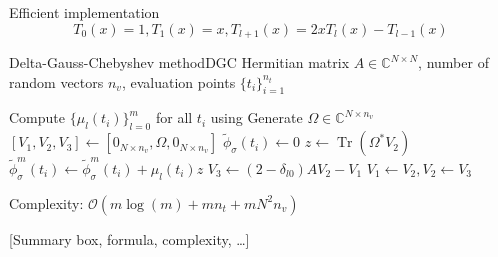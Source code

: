Efficient implementation \cite[Chapter~3]{trefethen2019chebyshev}
\begin{equation}
    T_0(x) = 1, T_1(x) = x, T_{l+1}(x) = 2x T_l(x) - T_{l-1}(x)
    \label{equ:2-chebyshev-DGC-chebyshev-recursion}
\end{equation}

\begin{algo}{Delta-Gauss-Chebyshev method}{DGC}
    Hermitian matrix $A \in \mathbb{C}^{N \times N}$, number of random vectors $n_v$,
    evaluation points $\{t_i\}_{i=1}^{n_t}$
    \begin{algorithmic}[1]
        \State Compute $\{\mu_l(t_i)\}_{l=0}^m$ for all $t_i$ using 
        \State Generate $\Omega \in \mathbb{C}^{N \times n_v}$
        \State $[V_1, V_2, V_3] \gets [0_{N \times n_v}, \Omega, 0_{N \times n_v}]$
        \State $\widetilde{\phi}_{\sigma}(t_i) \gets 0$
          \State $z \gets \operatorname{Tr}(\Omega^{\ast} V_2)$
            \State $\widetilde{\phi}_{\sigma}^m(t_i) \gets \widetilde{\phi}_{\sigma}^m(t_i) + \mu_l(t_i) z$
          \EndFor
          \State $V_3 \gets (2 - \delta_{l0}) A V_2 - V_1$ 
          \State $V_1 \gets V_2, V_2 \gets V_3$
        \EndFor
    \end{algorithmic}
\end{algo}

Complexity: $\mathcal{O}(m \log(m) + m n_t + m N^2 n_v)$

[Summary box, formula, complexity, \dots]
